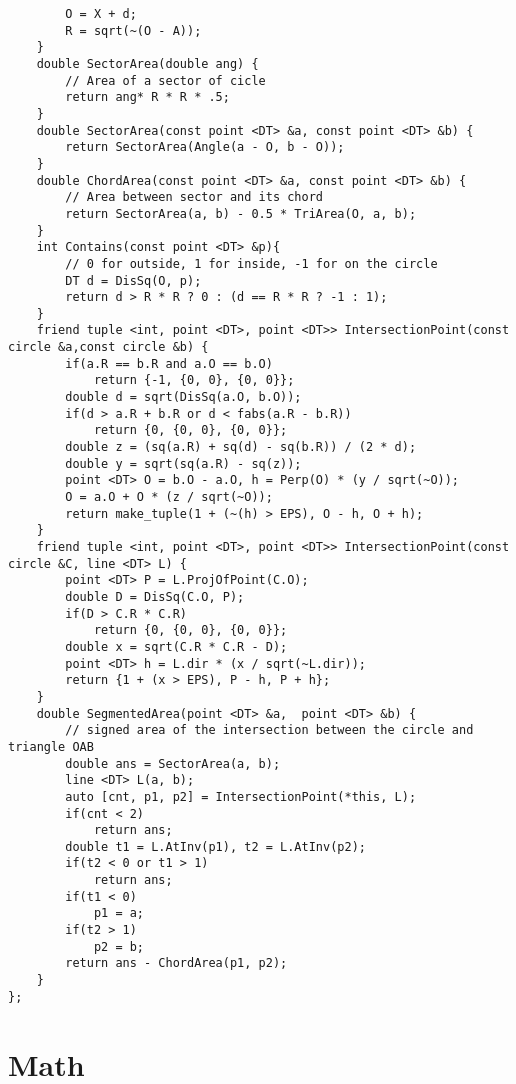\documentclass[10pt,a4paper,onesided]{article}
\begin{document}
\begin{multicols*}{3}
\begin{lstlisting}
        O = X + d;
        R = sqrt(~(O - A));
    }
    double SectorArea(double ang) {
        // Area of a sector of cicle
        return ang* R * R * .5;
    }
    double SectorArea(const point <DT> &a, const point <DT> &b) {
        return SectorArea(Angle(a - O, b - O));
    }
    double ChordArea(const point <DT> &a, const point <DT> &b) {
        // Area between sector and its chord
        return SectorArea(a, b) - 0.5 * TriArea(O, a, b);
    }
    int Contains(const point <DT> &p){
        // 0 for outside, 1 for inside, -1 for on the circle
        DT d = DisSq(O, p);
        return d > R * R ? 0 : (d == R * R ? -1 : 1);
    }
    friend tuple <int, point <DT>, point <DT>> IntersectionPoint(const circle &a,const circle &b) {
        if(a.R == b.R and a.O == b.O)
            return {-1, {0, 0}, {0, 0}};
        double d = sqrt(DisSq(a.O, b.O));
        if(d > a.R + b.R or d < fabs(a.R - b.R))
            return {0, {0, 0}, {0, 0}};
        double z = (sq(a.R) + sq(d) - sq(b.R)) / (2 * d);
        double y = sqrt(sq(a.R) - sq(z));
        point <DT> O = b.O - a.O, h = Perp(O) * (y / sqrt(~O));
        O = a.O + O * (z / sqrt(~O));
        return make_tuple(1 + (~(h) > EPS), O - h, O + h);
    }
    friend tuple <int, point <DT>, point <DT>> IntersectionPoint(const circle &C, line <DT> L) {
        point <DT> P = L.ProjOfPoint(C.O);
        double D = DisSq(C.O, P);
        if(D > C.R * C.R)
            return {0, {0, 0}, {0, 0}};
        double x = sqrt(C.R * C.R - D); 
        point <DT> h = L.dir * (x / sqrt(~L.dir));
        return {1 + (x > EPS), P - h, P + h};
    } 
    double SegmentedArea(point <DT> &a,  point <DT> &b) {
        // signed area of the intersection between the circle and triangle OAB
        double ans = SectorArea(a, b);
        line <DT> L(a, b);
        auto [cnt, p1, p2] = IntersectionPoint(*this, L);
        if(cnt < 2)
            return ans;
        double t1 = L.AtInv(p1), t2 = L.AtInv(p2);
        if(t2 < 0 or t1 > 1)
            return ans;
        if(t1 < 0)
            p1 = a;
        if(t2 > 1)
            p2 = b;
        return ans - ChordArea(p1, p2);
    }
};
\end{lstlisting}
\section{Math}

\end{multicols*}
\end{document}
